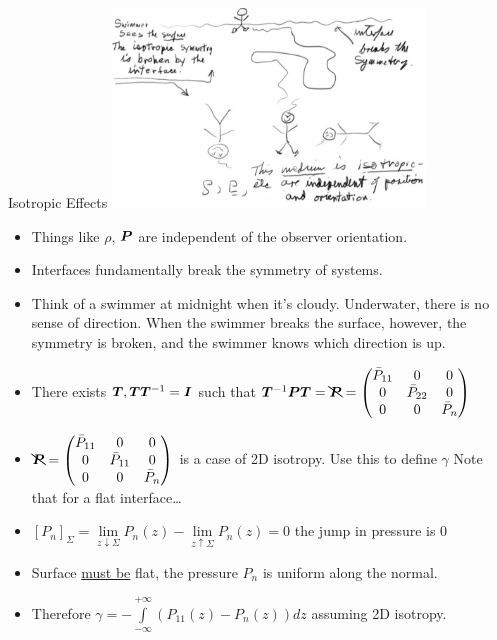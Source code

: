 \documentclass{article}
\begin{document}
\begin{section}{Isotropic Effects}
  \includegraphics[height=200px]{Day4NotesPics/swimmer}
  \begin{itemize}
    \item Things like $\rho$, $\bm{P}$ are independent of the observer orientation.
    \item Interfaces fundamentally break the symmetry of systems.
    \item Think of a swimmer at midnight when it's cloudy. Underwater, there is no sense of direction. When the swimmer breaks the surface, however, the symmetry is broken, and the swimmer knows which direction is up.
  \end{itemize}

  \begin{itemize}
    \item There exists $\bm{T}, \bm{T}\bm{T}^{-1} = \bm{I}$ such that $\bm{T}^{-1}\bm{P}\bm{T} = \bcancel{\bm{P}} = \begin{pmatrix}
	\bar{P}_{11} & 0            & 0 \\
	0 & \bar{P}_{22} &  0\\
	0 &  0           & \bar{P}_{n}
      \end{pmatrix}
      $ 
    \item $\bcancel{\bm{P}} = \begin{pmatrix}
	\bar{P}_{11} & 0            & 0 \\
	0 & \bar{P}_{11} &  0\\
	0 &  0           & \bar{P}_{n}
      \end{pmatrix}$ is
 a case of 2D isotropy. Use this to define $\gamma$ Note that for a flat interface\dots

\item $\left[P_n\right]_{\Sigma} = \lim\limits_{z\downarrow{\Sigma}} P_n(z) - \lim\limits_{z\uparrow \Sigma}P_n(z) = 0$ the jump in pressure is 0
\item Surface \underline{must be} flat, the pressure $P_n$ is uniform along the normal.

\item Therefore $\gamma = -\displaystyle\int\limits_{-\infty}^{+\infty}(P_{11}(z) - P_{n}(z))dz$ assuming 2D isotropy.
  \end{itemize}

\end{section}
\end{document}
